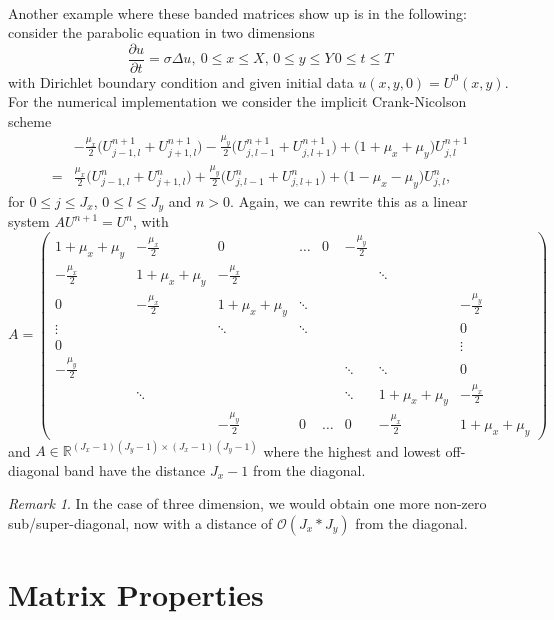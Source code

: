 \documentclass{article}
\numberwithin{pic}{section}
\numberwithin{lem}{section}
\numberwithin{thm}{section}
\numberwithin{cor}{section}
\theoremstyle{definition}
\numberwithin{ex}{section}
\numberwithin{defn}{section}
\theoremstyle{definition}
\theoremstyle{remark}
\newtheorem{rem}{Remark}
\newcommand{\R}{\ensuremath{\mathbb{R}}} %
\begin{document}
\paragraph{} Another example where these banded matrices show up is in the following:
consider the parabolic equation in two dimensions
\[\frac{\partial u}{\partial t}=\sigma \Delta u,~ 0\leq x\leq X,\, 0\leq y\leq Y\, 0\leq t\leq T\]
with Dirichlet boundary condition and given initial data $u(x,y,0)=U^0(x,y)$. For the numerical implementation we consider the implicit Crank-Nicolson scheme
\begin{align*}
&-\frac{\mu_x}{2}\big(U_{j-1,l}^{n+1}+ U_{j+1,l}^{n+1}\big) -\frac{\mu_y}{2}\big(U_{j,l-1}^{n+1}+U_{j,l+1}^{n+1}\big)+\big(1+\mu_x+\mu_y\big)U_{j,l}^{n+1}\\
=&\frac{\mu_x}{2}\big(U_{j-1,l}^{n}+ U_{j+1,l}^{n}\big) +\frac{\mu_y}{2}\big(U_{j,l-1}^{n}+U_{j,l+1}^{n}\big)+\big(1-\mu_x-\mu_y\big)U_{j,l}^{n},
\end{align*}
for $0\leq j\leq J_x$, $0\leq l\leq J_y$ and $n>0$.
Again, we can rewrite this as a linear system $AU^{n+1}=U^n$, with 
\[A=\begin{pmatrix}
1+\mu_x+\mu_y & -\frac{\mu_x}{2} & 0 & \dots & 0 & -\frac{\mu_y}{2} &  &  \\ 
-\frac{\mu_x}{2} & 1+\mu_x+\mu_y & -\frac{\mu_x}{2} &  &  &  & \ddots &  \\ 
0 & -\frac{\mu_x}{2} & 1+\mu_x+\mu_y & \ddots &  &  &  & -\frac{\mu_y}{2} \\ 
\vdots  &  & \ddots & \ddots &  &  &  & 0\\ 
0 &  &  &  &  &  &  & \vdots \\ 
-\frac{\mu_y}{2} &  &  &  &  & \ddots & \ddots & 0 \\ 
 & \ddots &  &  &  & \ddots & 1+\mu_x+\mu_y & -\frac{\mu_x}{2} \\ 
 &  & -\frac{\mu_y}{2} & 0 & \dots & 0 & -\frac{\mu_x}{2} & 1+\mu_x+\mu_y
\end{pmatrix} \]
and $A\in\R^{(J_x-1)(J_y-1)\times (J_x-1)(J_y-1)}$ where the highest and lowest off-diagonal band have the distance $J_x-1$ from the diagonal.
\begin{rem}
In the case of three dimension, we would obtain one more non-zero sub/super-diagonal, now with a distance of $\mathcal{O}(J_x*J_y)$ from the diagonal.
\end{rem}
\pagebreak
\section{Matrix Properties}
\end{document}
